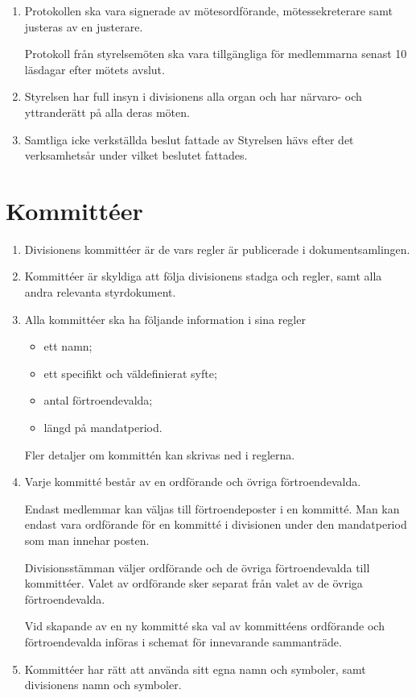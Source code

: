 \documentclass{dvd}
\begin{document}
\begin{enumerate}[label=\arabic* §, ref=\arabic*]
		\item Protokollen ska vara signerade av mötesordförande, mötessekreterare samt justeras av en justerare.

		Protokoll från styrelsemöten ska vara tillgängliga för medlemmarna senast 10 läsdagar efter mötets avslut.

		\item Styrelsen har full insyn i divisionens alla organ och har närvaro- och yttranderätt på alla deras möten.

                \item Samtliga icke verkställda beslut fattade av Styrelsen hävs efter det verksamhetsår under vilket beslutet fattades.
	\end{enumerate}

	\section{Kommittéer}

	\begin{enumerate}[label=\arabic* §, ref=\arabic*]
		\item Divisionens kommittéer är de vars regler är publicerade i dokumentsamlingen.

		\item Kommittéer är skyldiga att följa divisionens stadga och regler, samt alla andra relevanta styrdokument.

		\item Alla kommittéer ska ha följande information i sina regler

		\begin{itemize}
			\item ett namn;

			\item ett specifikt och väldefinierat syfte;

			\item antal förtroendevalda;

			\item längd på mandatperiod.
		\end{itemize}

		Fler detaljer om kommittén kan skrivas ned i reglerna.

		\item Varje kommitté består av en ordförande och övriga förtroendevalda.

		Endast medlemmar kan väljas till förtroendeposter i en kommitté.
		Man kan endast vara ordförande för en kommitté i divisionen under den mandatperiod som man innehar posten.

		Divisionsstämman väljer ordförande och de övriga förtroendevalda till kommittéer.
		Valet av ordförande sker separat från valet av de övriga förtroendevalda.

		Vid skapande av en ny kommitté ska val av kommittéens ordförande och förtroendevalda införas i schemat för innevarande sammanträde.

		\item Kommittéer har rätt att använda sitt egna namn och symboler, samt divisionens namn och symboler.
	\end{enumerate}
\end{document}
